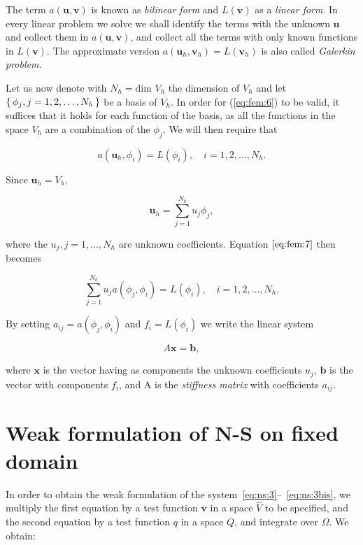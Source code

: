 \documentclass[a4paper,11pt,openright,twoside]{book}
\begin{document}
The term $a(\mathbf{u}, \mathbf{v})$ is known as \emph{bilinear form} and $L(\mathbf{v})$ as a \emph{linear form}. In every linear problem we solve we shall identify the terms with the unknown $\mathbf{u}$ and collect them in $a(\mathbf{u}, \mathbf{v})$, and collect all the terms with only known functions in $L(\mathbf{v})$. The approximate version $a(\mathbf{u}_h, \mathbf{v}_h) = L(\mathbf{v}_h)$ is also called \emph{Galerkin problem}.

Let us now denote with $N_h = \text{dim } V_h $ the dimension of $V_h$ and let $\set{\phi_j, j = 1,2, \ldots, N_h }$ be a basis of $V_h$. In order for (\ref{eq:fem:6}) to be valid, it suffices that it holds for each function of the basis, as all the functions in the space $V_h$ are a combination of the $\phi_j$. We will then require that

\begin{equation}
\label{eq:fem:7}
a(\mathbf{u}_h, \phi_i) = L(\phi_i), \quad i = 1,2, \ldots, N_h.
\end{equation}

Since $\mathbf{u}_h = V_h$,

\begin{equation}
\mathbf{u}_h = \sum_{j=1}^{N_h} u_j \phi_j,
\end{equation}

where the $u_j, j=1, \ldots, N_h$ are unknown coefficients. Equation $\ref{eq:fem:7}$ then becomes

\begin{equation}
\sum_{j=1}^{N_h} u_j a(\phi_j, \phi_i) = L(\phi_i), \quad i = 1,2, \ldots, N_h.
\end{equation}

By setting $a_{ij} = a(\phi_j, \phi_i)$ and $f_i = L(\phi_i)$ we write the linear system

\begin{equation}
A \mathbf{x} = \mathbf{b},
\end{equation}

where $\mathbf{x}$ is the vector having as components the unknown coefficients $u_j$, $\mathbf{b}$ is the vector with components $f_i$, and A is the \emph{stiffness matrix} with coefficients $a_{ij}$.



\section{Weak formulation of N-S on fixed domain}

In order to obtain the weak formulation of the system~\eqref{eq:ns:3}--~\eqref{eq:ns:3bis}, we multiply the first equation by a test function $\mathbf{v}$ in a space $\hat{V}$ to be specified, and the second equation by a test function $q$ in a space $Q$, and integrate over $\Omega$. 
We obtain:
\end{document}
